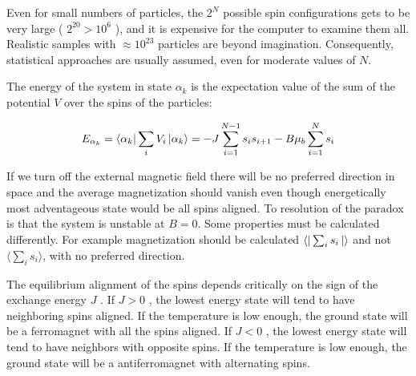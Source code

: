 \documentclass[12pt]{article}
\theoremstyle{plain}
\begin{document}
\vspace{2mm}

\par Even for small numbers of particles, the $2^N$ possible spin configurations gets to be very
large ( $2^{20} > 10^6$ ), and it is expensive for the computer to examine them all. Realistic samples
with $\approx 10^{23}$ particles are beyond imagination. Consequently, statistical approaches are usually
assumed, even for moderate values of $N$.

\vspace{2mm}

\par The energy of the system in state $\alpha_k$ is the expectation value of the sum of the potential $V$
over the spins of the particles:

\vspace{2mm}

\begin{equation*}
    E_{\alpha_k} = \bra{\alpha_k}\sum_{i}V_i\ket{\alpha_k} = -J\sum_{i=1}^{N-1}s_i s_{i+1} - B\mu_{b}\sum_{i=1}^{N}s_i
\end{equation*}

\vspace{2mm}

\par If we turn off the external magnetic field there will be no preferred
direction in space and the average magnetization should vanish even though
energetically most adventageous state would be all spins aligned. To
resolution of the paradox is that the system is unstable at $B=0$. Some properties must be
calculated differently. For example magnetization should be calculated $\bra{}\sum_{i}s_{i}\ket{}$
and not $\langle \sum_{i}s_{i}\rangle$, with no preferred direction.

\vspace{2mm}

\par The equilibrium alignment of the spins depends critically on the sign of the exchange
energy $J$ . If $J > 0$ , the lowest energy state will tend to have neighboring spins aligned. If the
temperature is low enough, the ground state will be a ferromagnet with all the spins aligned.
If $J < 0$ , the lowest energy state will tend to have neighbors with opposite spins. If the
temperature is low enough, the ground state will be a antiferromagnet with alternating spins.

\vspace{2mm}
\end{document}
